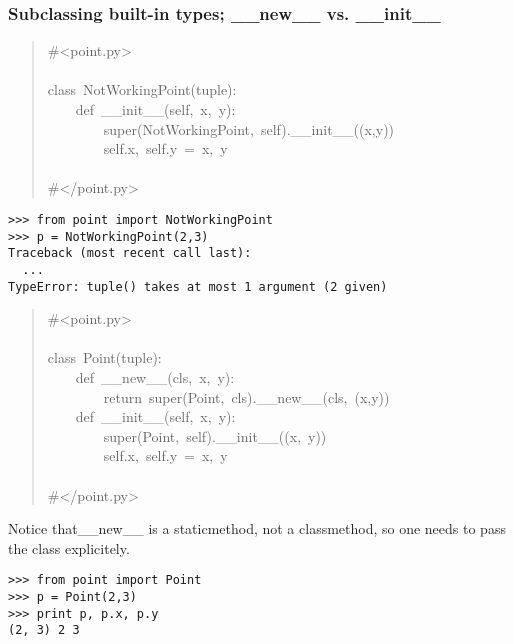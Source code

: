\documentclass[10pt,a4paper,english]{article}
\begin{document}
\subsubsection*{Subclassing built-in types; {\_}{\_}new{\_}{\_} vs. {\_}{\_}init{\_}{\_}}
\begin{quote}{\ttfamily \raggedright \noindent
{\#}<point.py>~\\
~\\
class~NotWorkingPoint(tuple):~\\
~~~~def~{\_}{\_}init{\_}{\_}(self,~x,~y):~\\
~~~~~~~~super(NotWorkingPoint,~self).{\_}{\_}init{\_}{\_}((x,y))~\\
~~~~~~~~self.x,~self.y~=~x,~y~\\
~\\
{\#}</point.py>
}\end{quote}
\begin{verbatim}>>> from point import NotWorkingPoint
>>> p = NotWorkingPoint(2,3)
Traceback (most recent call last):
  ...
TypeError: tuple() takes at most 1 argument (2 given)\end{verbatim}
\begin{quote}{\ttfamily \raggedright \noindent
{\#}<point.py>~\\
~\\
class~Point(tuple):~\\
~~~~def~{\_}{\_}new{\_}{\_}(cls,~x,~y):~\\
~~~~~~~~return~super(Point,~cls).{\_}{\_}new{\_}{\_}(cls,~(x,y))~\\
~~~~def~{\_}{\_}init{\_}{\_}(self,~x,~y):~\\
~~~~~~~~super(Point,~self).{\_}{\_}init{\_}{\_}((x,~y))~\\
~~~~~~~~self.x,~self.y~=~x,~y~\\
~\\
{\#}</point.py>
}\end{quote}

Notice that{\_}{\_}new{\_}{\_} is a staticmethod, not a classmethod, so one needs
to pass the class explicitely.
\begin{verbatim}>>> from point import Point
>>> p = Point(2,3)
>>> print p, p.x, p.y
(2, 3) 2 3\end{verbatim}



\hypertarget{be-careful-when-using-new-with-mutable-types}{}
\end{document}

